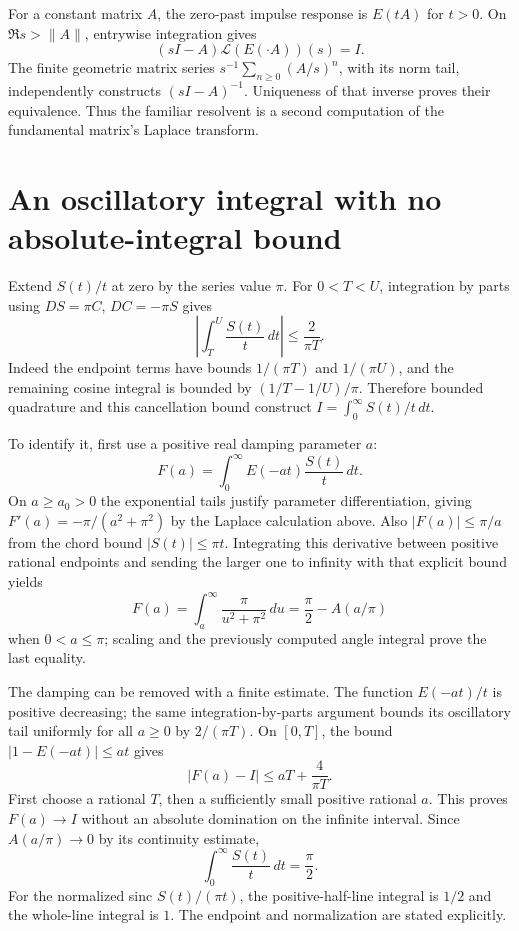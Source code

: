 For a constant matrix $A$, the zero-past impulse response is $E(tA)$
for $t>0$.  On $\Re s>\|A\|$, entrywise integration gives
\[
 (sI-A)\mathcal L(E(\cdot A))(s)=I.
\]
The finite geometric matrix series
$s^{-1}\sum_{n\ge0}(A/s)^n$, with its norm tail, independently constructs
$(sI-A)^{-1}$.  Uniqueness of that inverse proves their equivalence.  Thus
the familiar resolvent is a second computation of the fundamental matrix's
Laplace transform.

\section{An oscillatory integral with no absolute-integral bound}
Extend $S(t)/t$ at zero by the series value $\pi$.  For $0<T<U$,
integration by parts using $DS=\pi C$, $DC=-\pi S$ gives
\[
 \left|\int_T^U\frac{S(t)}t\,dt\right|\le\frac{2}{\pi T}.
\]
Indeed the endpoint terms have bounds $1/(\pi T)$ and $1/(\pi U)$,
and the remaining cosine integral is bounded by
$(1/T-1/U)/\pi$.  Therefore bounded quadrature and this cancellation
bound construct $I=\int_0^\infty S(t)/t\,dt$.

To identify it, first use a positive real damping parameter $a$:
\[
 F(a)=\int_0^\infty E(-at)\frac{S(t)}t\,dt.
\]
On $a\ge a_0>0$ the exponential tails justify parameter differentiation,
giving $F'(a)=-\pi/(a^2+\pi^2)$ by the Laplace calculation above.
Also $|F(a)|\le\pi/a$ from the chord bound $|S(t)|\le\pi t$.
Integrating this derivative between positive rational endpoints and sending
the larger one to infinity with that explicit bound yields
\[
 F(a)=\int_a^\infty\frac\pi{u^2+\pi^2}\,du
     =\frac\pi2-A(a/\pi)
\]
when $0<a\le\pi$; scaling and the previously computed angle integral
prove the last equality.

The damping can be removed with a finite estimate.  The function
$E(-at)/t$ is positive decreasing; the same integration-by-parts argument
bounds its oscillatory tail uniformly for all $a\ge0$ by $2/(\pi T)$.
On $[0,T]$, the bound $|1-E(-at)|\le at$ gives
\[
 |F(a)-I|\le aT+\frac4{\pi T}.
\]
First choose a rational $T$, then a sufficiently small positive rational
$a$.  This proves $F(a)\to I$ without an absolute domination on the
infinite interval.  Since $A(a/\pi)\to0$ by its continuity estimate,
\[
 \boxed{\int_0^\infty\frac{S(t)}t\,dt=\frac\pi2.}
\]
For the normalized sinc $S(t)/(\pi t)$, the positive-half-line integral
is $1/2$ and the whole-line integral is $1$.  The endpoint and normalization
are stated explicitly.

